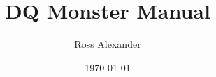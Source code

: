 \documentclass[a4paper]{article}
\title{DQ Monster Manual}
\author{Ross Alexander}
\date{\today}
\begin{document}
\maketitle

\begin{multicols}{2}
\tableofcontents
\end{multicols}













\end{document}
